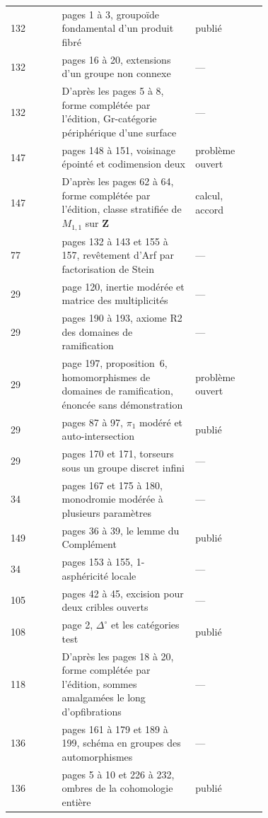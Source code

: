 {\begin{longtable}{@{}l>{\raggedright\arraybackslash}p{0.52\linewidth}>{\raggedright\arraybackslash}p{0.2\linewidth}r@{}}
132 & pages 1 à 3, groupoïde fondamental d'un produit fibré & publié & \pageref{nv:100}\\
132 & pages 16 à 20, extensions d'un groupe non connexe & --- & \pageref{nv:101}\\
132 & D'après les pages 5 à 8, forme complétée par l'édition, Gr-catégorie périphérique d'une surface & --- & \pageref{nv:102}\\
147 & pages 148 à 151, voisinage épointé et codimension deux & problème ouvert & \pageref{nv:103}\\
147 & D'après les pages 62 à 64, forme complétée par l'édition, classe stratifiée de $M_{1,1}$ sur $\mathbf Z$ & calcul, accord & \pageref{nv:104}\\
77 & pages 132 à 143 et 155 à 157, revêtement d'Arf par factorisation de Stein & --- & \pageref{nv:105}\\
29 & page 120, inertie modérée et matrice des multiplicités & --- & \pageref{nv:106}\\
29 & pages 190 à 193, axiome R2 des domaines de ramification & --- & \pageref{nv:107}\\
29 & page 197, proposition~6, homomorphismes de domaines de ramification, énoncée sans démonstration & problème ouvert & \pageref{nv:108}\\
29 & pages 87 à 97, $\pi_1$ modéré et auto-intersection & publié & \pageref{nv:109}\\
29 & pages 170 et 171, torseurs sous un groupe discret infini & --- & \pageref{nv:110}\\
34 & pages 167 et 175 à 180, monodromie modérée à plusieurs paramètres & --- & \pageref{nv:111}\\
149 & pages 36 à 39, le lemme du Complément & publié & \pageref{nv:112}\\
34 & pages 153 à 155, 1-asphéricité locale & --- & \pageref{nv:113}\\
105 & pages 42 à 45, excision pour deux cribles ouverts & --- & \pageref{nv:114}\\
108 & page 2, $\Delta^\circ$ et les catégories test & publié & \pageref{nv:115}\\
118 & D'après les pages 18 à 20, forme complétée par l'édition, sommes amalgamées le long d'opfibrations & --- & \pageref{nv:116}\\
136 & pages 161 à 179 et 189 à 199, schéma en groupes des automorphismes & --- & \pageref{nv:117}\\
136 & pages 5 à 10 et 226 à 232, ombres de la cohomologie entière & publié & \pageref{nv:118}\\

\end{longtable}}
